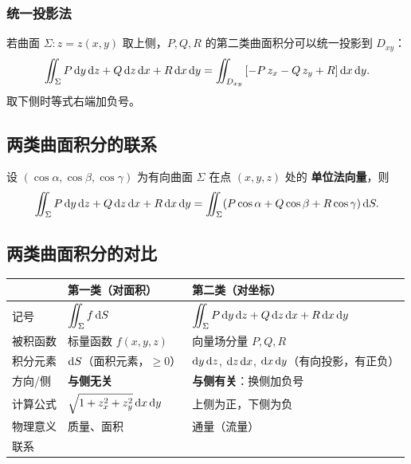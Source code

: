 \documentclass{article}
\begin{document}
\subsubsection*{统一投影法}

若曲面 $\Sigma: z = z(x,y)$ 取上侧，$P, Q, R$ 的第二类曲面积分可以统一投影到 $D_{xy}$：
\[
  \iint_\Sigma P\,\mathrm{d} y\,\mathrm{d} z + Q\,\mathrm{d} z\,\mathrm{d} x + R\,\mathrm{d} x\,\mathrm{d} y
  = \iint_{D_{xy}} \left[ -P\,z_x - Q\,z_y + R \right] \mathrm{d} x\,\mathrm{d} y.
\]
取下侧时等式右端加负号。

\subsection{两类曲面积分的联系}

设 $(\cos\alpha, \cos\beta, \cos\gamma)$ 为有向曲面 $\Sigma$ 在点 $(x,y,z)$ 处的
\textbf{单位法向量}，则
\[
  \iint_\Sigma P\,\mathrm{d} y\,\mathrm{d} z + Q\,\mathrm{d} z\,\mathrm{d} x + R\,\mathrm{d} x\,\mathrm{d} y
  = \iint_\Sigma (P\cos\alpha + Q\cos\beta + R\cos\gamma) \,\mathrm{d} S.
\]

\subsection{两类曲面积分的对比}

\begin{center}
  \renewcommand{\arraystretch}{1.6}
  \begin{tabular}{>{\raggedright\arraybackslash}p{3cm}
      >{\raggedright\arraybackslash}p{5cm}
    >{\raggedright\arraybackslash}p{5cm}}
    \toprule
    & \textbf{第一类（对面积）} & \textbf{第二类（对坐标）} \\
    \midrule
    记号
    & $\displaystyle\iint_\Sigma f \,\mathrm{d} S$
    & $\displaystyle\iint_\Sigma P\,\mathrm{d} y\,\mathrm{d} z + Q\,\mathrm{d} z\,\mathrm{d}
    x + R\,\mathrm{d} x\,\mathrm{d} y$ \\
    被积函数
    & 标量函数 $f(x,y,z)$
    & 向量场分量 $P, Q, R$ \\
    积分元素
    & $\mathrm{d} S$（面积元素，$\ge 0$）
    & $\mathrm{d} y\,\mathrm{d} z$, $\mathrm{d} z\,\mathrm{d} x$, $\mathrm{d} x\,\mathrm{d} y$（有向投影，有正负） \\
    方向/侧
    & \textbf{与侧无关}
    & \textbf{与侧有关}：换侧加负号 \\
    计算公式
    & $\sqrt{1+z_x^2+z_y^2}\,\mathrm{d} x\,\mathrm{d} y$
    & 上侧为正，下侧为负 \\
    物理意义
    & 质量、面积
    & 通量（流量） \\
    联系
    & \multicolumn{2}{c}{$\displaystyle\iint_\Sigma \mathbf{F} \cdot
    \dif\mathbf{S} = \iint_\Sigma (\mathbf{F}\cdot\mathbf{n}) \,\dif S$} \\
    \bottomrule
  \end{tabular}
\end{center}
\end{document}
